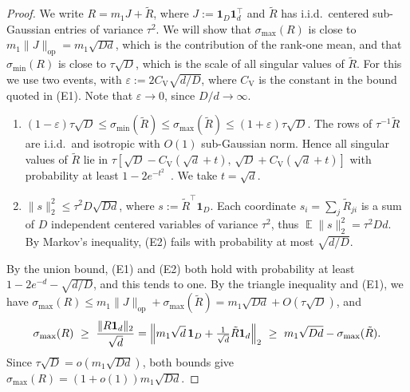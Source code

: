 \documentclass[11pt]{article}
\theoremstyle{definition}
\DeclareMathOperator{\EX}{\mathbb{E}}
\begin{document}
\begin{proof}
	We write $R=m_1 J+\tilde R$, where $J:=\mathbf 1_D\mathbf 1_d^{\!\top}$ and $\tilde R$
	has i.i.d.\ centered sub-Gaussian entries of variance $\tau^2$. We will show that
	$\sigma_{\max}(R)$ is close to $m_1\|J\|_{\operatorname{op}}=m_1\sqrt{Dd}$, which is the
	contribution of the rank-one mean, and that $\sigma_{\min}(R)$ is close to $\tau\sqrt D$,
	which is the scale of all singular values of $\tilde R$. For this we use two events, with
	$\varepsilon:=2C_{\mathrm V}\sqrt{d/D}$, where $C_{\mathrm V}$ is the constant in the bound
	quoted in (E1). Note that $\varepsilon\to0$, since $D/d\to\infty$.
	\begin{enumerate}
		\item[(E1)] $(1-\varepsilon)\tau\sqrt D\le\sigma_{\min}(\tilde R)\le\sigma_{\max}(\tilde R)\le(1+\varepsilon)\tau\sqrt D$.
		The rows of $\tau^{-1}\tilde R$ are i.i.d.\ and isotropic with $O(1)$
		sub-Gaussian norm. Hence all singular values of $\tilde R$ lie in
		$\tau[\sqrt D-C_{\mathrm V}(\sqrt d+t),\,\sqrt D+C_{\mathrm V}(\sqrt d+t)]$ with probability at least
		$1-2e^{-t^2}$~\cite[Thm.~4.6.1]{vershynin2018high}. We take $t=\sqrt d$.
		\item[(E2)] $\|s\|_2^2\le\tau^2D\sqrt{Dd}$, where $s:=\tilde R^{\!\top}\mathbf 1_D$.
		Each coordinate $s_i=\sum_j\tilde R_{ji}$ is a sum of $D$ independent centered
		variables of variance $\tau^2$, thus $\EX\|s\|_2^2=\tau^2Dd$. By Markov's inequality,
		(E2) fails with probability at most $\sqrt{d/D}$.
	\end{enumerate}
By the union bound, (E1) and (E2) both hold with probability at least
$1-2e^{-d}-\sqrt{d/D}$, and this tends to one. 
	By the triangle inequality and (E1), we have
	$\sigma_{\max}(R)\le m_1\|J\|_{\operatorname{op}}+\sigma_{\max}(\tilde R)=m_1\sqrt{Dd}+O(\tau\sqrt D)$,
	and
	\[
	\sigma_{\max}(R)\ \ge\ \frac{\|R\mathbf 1_d\|_2}{\sqrt d}
	=\Bigl\|m_1\sqrt d\,\mathbf 1_D+\tfrac1{\sqrt d}\tilde R\mathbf 1_d\Bigr\|_2
	\ \ge\ m_1\sqrt{Dd}-\sigma_{\max}(\tilde R).
	\]
	Since $\tau\sqrt D=o(m_1\sqrt{Dd})$, both bounds give
	$\sigma_{\max}(R)=(1+o(1))m_1\sqrt{Dd}$.


\end{proof}
\end{document}
